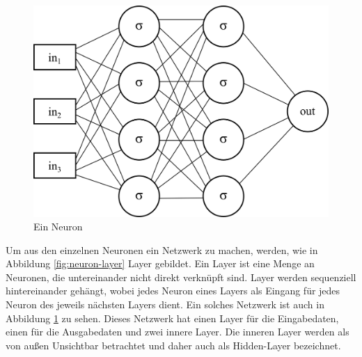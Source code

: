 \begin{figure}
\centering
\includegraphics[scale=1]{images/neuron-network.png}
\caption{Ein Neuron}
\label{fig:neuron-network}
\end{figure}

Um aus den einzelnen Neuronen ein Netzwerk zu machen, werden, wie in Abbildung \ref{fig:neuron-layer} Layer gebildet. Ein Layer ist eine Menge an Neuronen, die untereinander nicht direkt verknüpft sind. Layer werden sequenziell hintereinander gehängt, wobei jedes Neuron eines Layers als Eingang für jedes Neuron des jeweils nächsten Layers dient. Ein solches Netzwerk ist auch in Abbildung \ref{fig:neuron-network} zu sehen. Dieses Netzwerk hat einen Layer für die Eingabedaten, einen für die Ausgabedaten und zwei innere Layer. Die inneren Layer werden als von außen Unsichtbar betrachtet und daher auch als Hidden-Layer bezeichnet.

